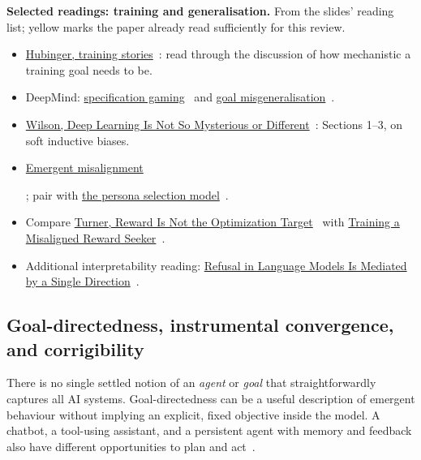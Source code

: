 \noindent\textbf{Selected readings: training and generalisation.} From the slides' reading list; yellow marks the paper already read sufficiently for this review.
\begin{itemize}
  \item \href{https://www.alignmentforum.org/posts/FDJnZt8Ks2djouQTZ/how-do-we-become-confident-in-the-safety-of-a-machine}{Hubinger, training stories}~\cite{hubinger2021trainingStories}: read through the discussion of how mechanistic a training goal needs to be.
  \item DeepMind: \href{https://deepmind.google/blog/specification-gaming-the-flip-side-of-ai-ingenuity/}{specification gaming}~\cite{krakovna2020specificationGaming} and \href{https://deepmind.google/blog/how-undesired-goals-can-arise-with-correct-rewards/}{goal misgeneralisation}~\cite{shah2022correctRewards}.
  \item \href{https://arxiv.org/abs/2503.02113}{Wilson, Deep Learning Is Not So Mysterious or Different}~\cite{wilson2025deepLearning}: Sections 1--3, on soft inductive biases.
  \item \colorbox{yellow!40}{\strut\href{https://www.nature.com/articles/s41586-025-09937-5}{Emergent misalignment}~\cite{betley2025emergent}}; pair with \href{https://alignment.anthropic.com/2026/psm/}{the persona selection model}~\cite{marks2026persona}.
  \item Compare \href{https://www.alignmentforum.org/posts/pdaGN6pQyQarFHXF4/reward-is-not-the-optimization-target}{Turner, Reward Is Not the Optimization Target}~\cite{turner2022reward} with \href{https://alignment.anthropic.com/2026/reward-seeker/}{Training a Misaligned Reward Seeker}~\cite{qi2026rewardSeeker}.
  \item Additional interpretability reading: \href{https://arxiv.org/abs/2406.11717}{Refusal in Language Models Is Mediated by a Single Direction}~\cite{arditi2024refusal}.
\end{itemize}

\subsection{Goal-directedness, instrumental convergence, and corrigibility}

There is no single settled notion of an \emph{agent} or \emph{goal} that straightforwardly captures all AI systems. Goal-directedness can be a useful description of emergent behaviour without implying an explicit, fixed objective inside the model. A chatbot, a tool-using assistant, and a persistent agent with memory and feedback also have different opportunities to plan and act~\cite{shah2019goalDirected}.


